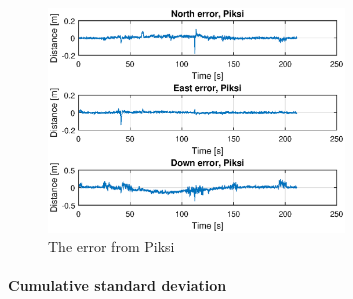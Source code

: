 \begin{figure}[H]
	\centering
		\includegraphics[width=0.7\textwidth]{figs/plots/errorPiksiWalk1.eps}
		\caption{The error from Piksi}
		\label{figure:errorPiksiwalk1}
\end{figure}
\paragraph{Cumulative standard deviation}

